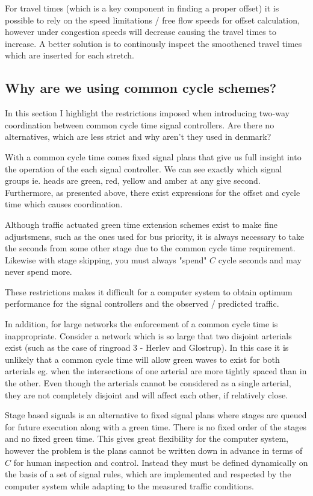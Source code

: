For travel times (which is a key component in finding a proper offset) it is possible to rely on the speed limitations / free flow speeds for offset calculation, however under congestion speeds will decrease causing the travel times to increase. A better solution is to continously inspect the smoothened travel times which are inserted for each stretch. 

\subsection*{Why are we using common cycle schemes?}
\label{phase_based}
In this section I highlight the restrictions imposed when introducing two-way coordination between common cycle time signal controllers. Are there no alternatives, which are less strict and why aren't they used in denmark?

With a common cycle time comes fixed signal plans that give us full insight into the operation of the each signal controller. We can see exactly which signal groups ie. heads are green, red, yellow and amber at any give second. Furthermore, as presented above, there exist expressions for the offset and cycle time which causes coordination. 

Although traffic actuated green time extension schemes exist to make fine adjustsmens, such as the ones used for bus priority, it is always necessary to take the seconds from some other stage due to the common cycle time requirement. Likewise with stage skipping, you must always "spend" $C$ cycle seconds and may never spend more.

These restrictions makes it difficult for a computer system to obtain optimum performance for the signal controllers and the observed / predicted traffic.

In addition, for large networks the enforcement of a common cycle time is inappropriate. Consider a network which is so large that two disjoint arterials exist (such as the case of ringroad 3 - Herlev and Glostrup). In this case it is unlikely that a common cycle time will allow green waves to exist for both arterials eg. when the intersections of one arterial are more tightly spaced than in the other. Even though the arterials cannot be considered as a single arterial, they are not completely disjoint and will affect each other, if relatively close.

Stage based signals is an alternative to fixed signal plans where stages are queued for future execution along with a green time. There is no fixed order of the stages and no fixed green time. This gives great flexibility for the computer system, however the problem is the plans cannot be written down in advance in terms of $C$ for human inspection and control. Instead they must be defined dynamically on the basis of a set of signal rules, which are implemented and respected by the computer system while adapting to the measured traffic conditions. 

